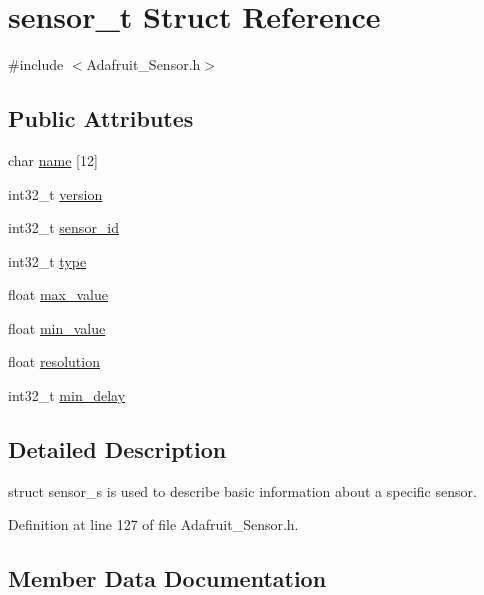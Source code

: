\hypertarget{structsensor__t}{}\section{sensor\+\_\+t Struct Reference}
\label{structsensor__t}


{\ttfamily \#include $<$Adafruit\+\_\+\+Sensor.\+h$>$}

\subsection*{Public Attributes}
\begin{DoxyCompactItemize}
\item 
char \hyperlink{structsensor__t_a4383b68d36f9dc4096d83583c3b009bf}{name} \mbox{[}12\mbox{]}
\item 
int32\+\_\+t \hyperlink{structsensor__t_a274f12a47669fbd2b61935706339e1c2}{version}
\item 
int32\+\_\+t \hyperlink{structsensor__t_a224f6201d59873cc1b6e9dd8a1894736}{sensor\+\_\+id}
\item 
int32\+\_\+t \hyperlink{structsensor__t_ae1d59df64438923d3bd95f2416c32203}{type}
\item 
float \hyperlink{structsensor__t_a1a17359f1080eb169a452656f7dec1ee}{max\+\_\+value}
\item 
float \hyperlink{structsensor__t_a4556ed82a0389a7f6af25a6fd0ee1431}{min\+\_\+value}
\item 
float \hyperlink{structsensor__t_a926aba3216afd50e62c0a6cdbcc7433a}{resolution}
\item 
int32\+\_\+t \hyperlink{structsensor__t_a1cd271377ff25ec9ca54886f876c87ec}{min\+\_\+delay}
\end{DoxyCompactItemize}


\subsection{Detailed Description}
struct sensor\+\_\+s is used to describe basic information about a specific sensor. 

Definition at line 127 of file Adafruit\+\_\+\+Sensor.\+h.



\subsection{Member Data Documentation}
